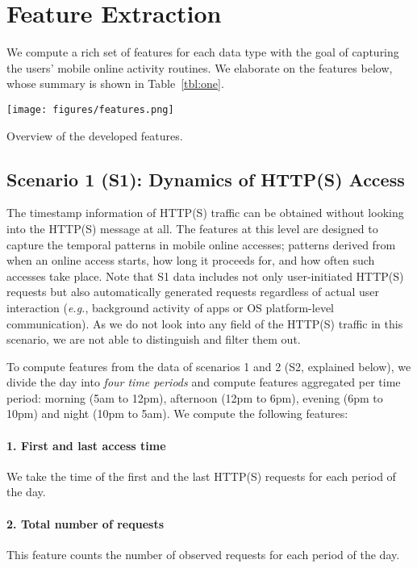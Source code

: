 \section{Feature Extraction}
We compute a rich set of features for each data type with the goal of capturing the users' mobile online activity routines. We elaborate on the features below, whose summary is shown in Table~\ref{tbl:one}. 

\begin{table}
  \texttt{[image: figures/features.png]}
  \caption{Overview of the developed features.}
  \label{tbl:one}
\end{table}

\subsection{Scenario 1 (S1): Dynamics of HTTP(S) Access}
The timestamp information of HTTP(S) traffic can be obtained without looking into the HTTP(S) message at all. The features at this level are designed to capture the temporal patterns in mobile online accesses; patterns derived from when an online access starts, how long it proceeds for, and how often such accesses take place. Note that S1 data includes not only user-initiated HTTP(S) requests but also automatically generated requests regardless of actual user interaction (\textit{e.g.}, background activity of apps or OS platform-level communication). As we do not look into any field of the HTTP(S) traffic in this scenario, we are not able to distinguish and filter them out. 

To compute features from the data of scenarios 1 and 2 (S2, explained below), we divide the day into \textit{four time periods} and compute features aggregated per time period: morning (5am to 12pm), afternoon (12pm to 6pm), evening (6pm to 10pm) and night (10pm to 5am).
We compute the following features:

\paragraph{1. First and last access time} We take the time of the first and the last HTTP(S) requests for each period of the day. 

\paragraph{2. Total number of requests} This feature counts the number of observed requests for each period of the day.

